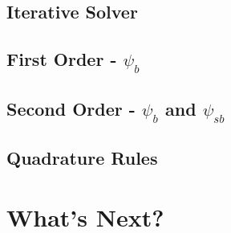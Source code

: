 \documentclass [10pt,letterpaper]{article}
\begin{document}
\subsection{Iterative Solver}
\label{sub:iterative-solver}
\subsection{First Order - $\psi_b$}
\label{sub:first-order-psib}
\subsection{Second Order - $\psi_b$ and $\psi_{sb}$}
\label{sub:second-order-psib-and-psisb} 
\subsection{Quadrature Rules}
\label{sub:quadrature-rules}
\section{What's Next?}
\label{sec:whats-next}
\end{document}
